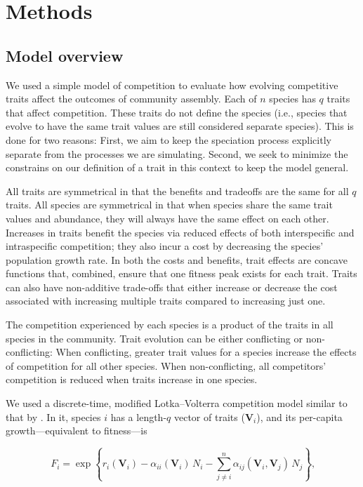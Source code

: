 
\section*{Methods}


\subsection*{Model overview}

We used a simple model of competition to evaluate how evolving competitive traits
affect the outcomes of community assembly.
Each of $n$ species has $q$ traits that affect competition.
These traits do not define the species (i.e., species that evolve to have
the same trait values are still considered separate species).
This is done for two reasons:
First, we aim to keep the speciation process explicitly
separate from the processes we are simulating.
Second, we seek to minimize the constrains on our definition of a trait
in this context to keep the model general.


All traits are symmetrical in that the benefits and tradeoffs are 
the same for all $q$ traits.
All species are symmetrical in that when species share the same trait values and abundance, 
they will always have the same effect on each other.
Increases in traits benefit the species via reduced
effects of both interspecific and intraspecific competition;
they also incur a cost by decreasing the species' population growth rate.
In both the costs and benefits, trait effects are concave functions that,
combined, ensure that one fitness peak exists for each trait.
Traits can also have non-additive trade-offs that either increase or decrease
the cost associated with increasing multiple traits compared to increasing
just one.


The competition experienced by each species is a product of the traits in all
species in the community.
Trait evolution can be either conflicting or non-conflicting:
When conflicting, greater trait values for a species increase the effects of
competition for all other species.
When non-conflicting, all competitors' competition is reduced when traits
increase in one species.


We used a discrete-time, modified Lotka--Volterra competition model similar to
that by \citet{Northfield:2013if}.
In it, species $i$ has a length-$q$ vector of traits ($\mathbf{V}_i$), and
its per-capita growth---equivalent to fitness---is

\begin{equation} \label{eq:fitness}
    F_{i} = \exp \left\{ r_i(\mathbf{V}_i) - 
        \alpha_{ii}(\mathbf{V}_i) \, N_i - \sum_{j \ne i}^{n}{
            \alpha_{ij}(\mathbf{V}_i, \mathbf{V}_j) \, N_j}  
    \right\}\textrm{,}
\end{equation}

